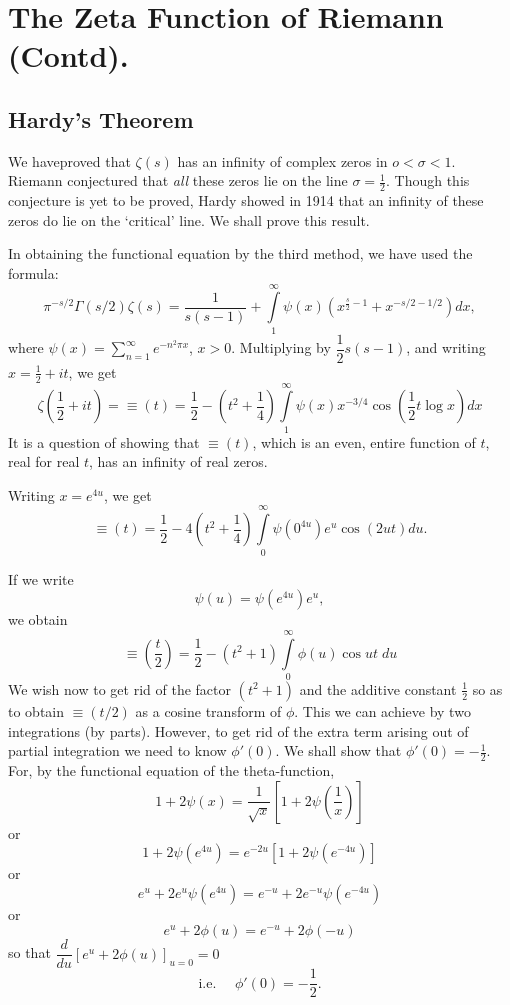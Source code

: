 
\chapter{The Zeta Function of Riemann (Contd).}\label{chap15}

\setcounter{section}{9}
\section[Hardy's Theorem]{Hardy's Theorem \cite[p.214]{key16}}\label{chap15:sec10} 
 We have\pageoriginale proved that $\zeta(s)$ has
an infinity of complex zeros in $o<\sigma <1$. Riemann conjectured
that {\em all} these zeros lie on the line $\sigma =\frac{1}{2}$. Though
this conjecture is yet to be proved, Hardy showed in 1914 that an
infinity of these zeros do lie on the `critical' line. We shall prove
this result.

In obtaining the functional equation by the third method, we have used
the formula:
$$
\pi^{-s/2} \Gamma(s/2) \zeta(s) = \frac{1}{s(s-1)} +
\int\limits^\infty_1  \psi (x) (x^{\frac{s}{2}-1} + x^{-s/2 -1/2}) dx,
$$
where $\psi(x) = \sum\limits^\infty_{n=1}e^{-n^2\pi x}$,
$x>0$. Multiplying by $\dfrac{1}{2} s(s-1)$, and writing $x
=\frac{1}{2} + it$, we get
$$
\zeta \left(\frac{1}{2}+it \right) = \equiv (t) = \frac{1}{2} - \left(t^2 + \frac{1}{4} \right) \int\limits^\infty_1 \psi(x) x^{-3/4} \cos \left(\frac{1}{2} t \log x \right)dx
$$
It is a question of showing that $\equiv (t)$, which is an even,
entire function of $t$, real for real $t$, has an infinity of real
zeros.

Writing $x = e^{4u}$, we get
$$
\equiv (t) = \frac{1}{2} - 4 \left(t^2 + \frac{1}{4} \right) \int\limits^\infty_0
\psi (0^{4u}) e^u \cos (2ut) du.
$$

If we write
$$
\psi (u) = \psi (e^{4u}) e^u,
$$
we obtain\pageoriginale
$$
\equiv \left(\frac{t}{2} \right) = \frac{1}{2} - (t^2+1) \int\limits^\infty_0
\phi(u) \cos ut \; du
$$
We wish now to get rid of the factor $(t^2+1)$ and the additive
constant $\frac{1}{2}$ so as to obtain $\equiv (t/2)$ as a cosine
transform of $\phi$. This we can achieve by two integrations (by
parts). However, to get rid of the extra term arising out of partial
integration we need to know $\phi'(0)$. We shall show that
$\phi'(0)=-\frac{1}{2}$. For, by the functional equation of the
theta-function, 
$$
1 + 2 \psi(x) = \frac{1}{\surd x} \left[1 + 2 \psi \left(
  \frac{1}{x}\right) \right] 
$$
or
$$
1+2 \psi (e^{4u}) = e^{-2u} [1 + 2  \psi (e^{-4u})]
$$
or
$$
e^u + 2 e^u \psi (e^{4u}) = e^{-u} + 2 e^{-u} \psi(e^{-4u})
$$
or
$$
e^u + 2 \phi (u) = e^{-u} + 2 \phi (-u)
$$
so that \quad $\dfrac{d}{du} \left[ e^u + 2 \phi (u)\right]_{u=0} = 0$ 
$$
\text{i.e. } \quad \phi'(0) = - \frac{1}{2}.
$$

